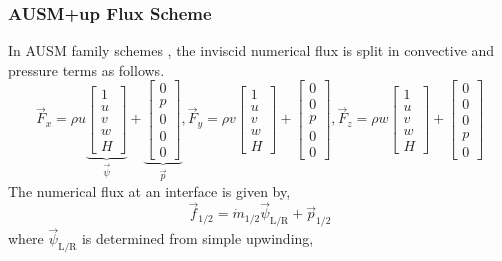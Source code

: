 \subsubsection{AUSM+up Flux Scheme}
In AUSM family schemes \cite{Liou2006-AUSM+up}, the inviscid numerical
flux is split in convective and pressure terms as follows.
\begin{equation}
  \vec{F}_x = \rho u \underbrace{\begin{bmatrix}
    1 \\ u \\ v \\ w \\ H
  \end{bmatrix}}_{\vec{\psi}} + \underbrace{\begin{bmatrix}
    0 \\ p \\ 0 \\ 0 \\ 0
  \end{bmatrix}}_{\vec{p}},
  \vec{F}_y = \rho v \begin{bmatrix}
    1 \\ u \\ v \\ w \\ H
  \end{bmatrix} + \begin{bmatrix}
    0 \\ 0 \\ p \\ 0 \\ 0
  \end{bmatrix},
  \vec{F}_z = \rho w \begin{bmatrix}
    1 \\ u \\ v \\ w \\ H
  \end{bmatrix} + \begin{bmatrix}
    0 \\ 0 \\ 0 \\ p \\ 0
  \end{bmatrix}
\end{equation}
The numerical flux at an interface is given by,
\begin{equation}
  \vec{f}_{\text{1/2}} = \dot{m}_{\text{1/2}} \vec{\psi}_{\text{L/R}} + \vec{p}_{\text{1/2}}
\end{equation}
where $\vec{\psi}_{\text{L/R}}$ is determined from simple upwinding,
